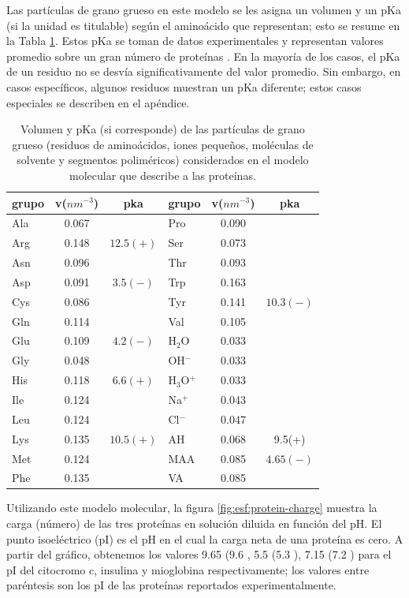 Las part\'iculas de grano grueso en este modelo se les asigna un volumen y un pKa (si la unidad es titulable) seg\'un el amino\'acido que representan; esto se resume en la Tabla \ref{table:Coarse-grain}.
Estos pKa se toman de datos experimentales y representan valores promedio sobre un gran n\'umero de prote\'inas \cite{grimsley2009summary}.
En la mayor\'ia de los casos, el pKa de un residuo no se desv\'ia significativamente del valor promedio.
Sin embargo, en casos espec\'ificos, algunos residuos muestran un pKa diferente;
estos casos especiales se describen en el ap\'endice. 





\begin{table}
\centering
\small
\begin{tabular}{|lcc|lcc|}
\hline
grupo & v($nm^{-3}$) & pka & grupo & v($nm^{-3}$) & pka \\
\hline
Ala & 0.067 &  & Pro & 0.090 & \\
Arg & 0.148 & $12.5 (+)$& Ser & 0.073 &\\
Asn & 0.096 &  & Thr & 0.093 & \\
Asp & 0.091 & $3.5 (-)$ & Trp & 0.163 &\\
Cys & 0.086 &  & Tyr & 0.141 & $10.3 (-)$\\
Gln & 0.114 & & Val & 0.105 &\\  
Glu & 0.109 & $4.2 (-)$ & H$_2$O & 0.033 & \\ 
Gly & 0.048 &  & OH$^-$ & 0.033 & \\
His & 0.118 & $6.6 (+)$& H$_3$O$^+$ & 0.033 &  \\ 
Ile & 0.124 &  & Na$^+$ & 0.043 & \\ %
Leu & 0.124 &  & Cl$^-$ & 0.047 & \\
Lys & 0.135 & $10.5 (+)$ & AH & 0.068 &  9.5(+)\\
Met & 0.124 & & MAA & 0.085 & $4.65(-)$\\
Phe & 0.135 &   & VA & 0.085 & \\
\hline
\end{tabular}
\caption{Volumen y pKa (si corresponde) de las part\'iculas de grano grueso (residuos de amino\'acidos, iones peque\~nos, mol\'eculas de solvente y segmentos polim\'ericos) considerados en el modelo molecular que describe a las prote\'inas.}
\label{table:Coarse-grain} 
\end{table}


Utilizando este modelo molecular, la figura \ref{fig:esf:protein-charge} muestra la carga (n\'umero) de las tres prote\'inas en soluci\'on diluida en funci\'on del pH.
El punto isoel\'ectrico (pI) es el pH en el cual la carga neta de una prote\'ina es cero.
A partir del gr\'afico, obtenemos los valores 9.65 (9.6 \cite{hristova2019isoelectric}, 5.5 (5.3 \cite{guckeisen2019isoelectric}), 7.15 (7.2 \cite{batys2020myoglobin}) para el pI del citocromo c, insulina y mioglobina respectivamente;
los valores entre par\'entesis son los pI de las prote\'inas reportados experimentalmente.


